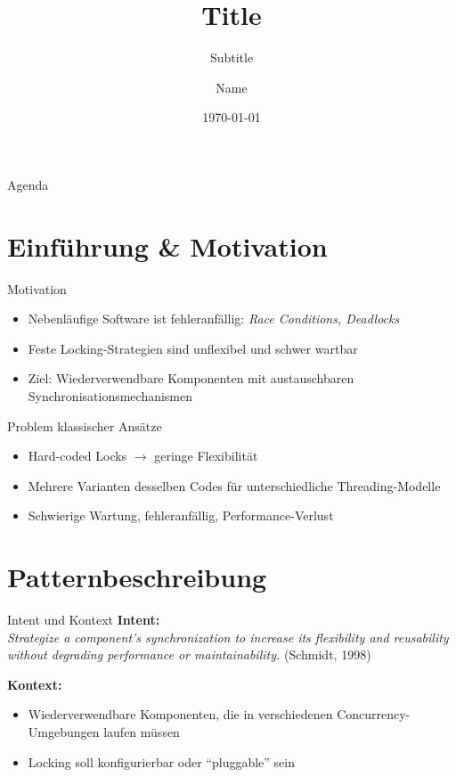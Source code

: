 \documentclass[aspectratio=169,10pt]{beamer}
\title[Title]{Title}
\subtitle{Subtitle}
\author[Name]{Name}
\institute[]{Studiengang -- Modulname}
\date{\today}
\begin{document}
\begin{frame}
  \titlepage
\end{frame}

\begin{frame}{Agenda}
  \tableofcontents[hideallsubsections]
\end{frame}

\section{Einf\"uhrung \& Motivation}
\begin{frame}{Motivation}
  \begin{itemize}
    \item Nebenl\"aufige Software ist fehleranf\"allig: \textit{Race Conditions, Deadlocks}
    \item Feste Locking-Strategien sind unflexibel und schwer wartbar
    \item Ziel: Wiederverwendbare Komponenten mit austauschbaren Synchronisationsmechanismen
  \end{itemize}
\end{frame}

\begin{frame}{Problem klassischer Ans\"atze}
  \begin{itemize}
    \item Hard-coded Locks $\rightarrow$ geringe Flexibilit\"at
    \item Mehrere Varianten desselben Codes f\"ur unterschiedliche Threading-Modelle
    \item Schwierige Wartung, fehleranf\"allig, Performance-Verlust
  \end{itemize}
\end{frame}

\section{Patternbeschreibung}
\begin{frame}{Intent und Kontext}
  \textbf{Intent:}\\
  \textit{Strategize a component's synchronization to increase its flexibility and reusability without degrading performance or maintainability.} (Schmidt, 1998)

  \vspace{1em}
  \textbf{Kontext:}
  \begin{itemize}
    \item Wiederverwendbare Komponenten, die in verschiedenen Concurrency-Umgebungen laufen m\"ussen
    \item Locking soll konfigurierbar oder \enquote{pluggable} sein
  \end{itemize}
\end{frame}
\end{document}
